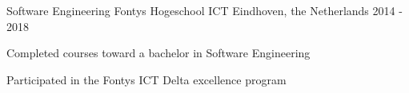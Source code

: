 

\begin{cventries}

  \cventry
    {Software Engineering} %
    {Fontys Hogeschool ICT} %
    {Eindhoven, the Netherlands} %
    {2014 - 2018} %
    {
      \begin{cvitems} %
        \item {Completed courses toward a bachelor in Software Engineering}
        \item {Participated in the Fontys ICT Delta excellence program}
      \end{cvitems}
    }

\end{cventries}
